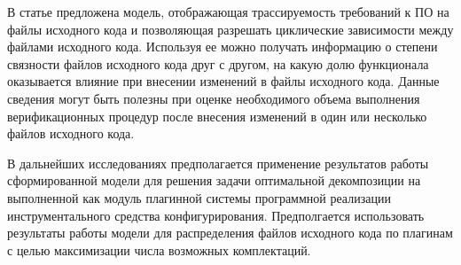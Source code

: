 

В статье предложена модель, отображающая трассируемость требований к ПО на файлы исходного кода и позволяющая разрешать циклические зависимости между файлами исходного кода. Используя ее можно получать информацию о степени связности файлов исходного кода друг с другом, на какую долю функционала оказывается влияние при внесении изменений в файлы исходного кода. Данные сведения могут быть полезны при оценке необходимого объема выполнения верификационных процедур после внесения изменений в один или несколько файлов исходного кода.

В дальнейших исследованиях предполагается применение результатов работы сформированной модели для решения задачи оптимальной декомпозиции на выполненной как модуль плагинной системы программной реализации инструментального средства конфигурирования. Предполгается использовать результаты работы модели для распределения файлов исходного кода по плагинам с целью максимизации числа возможных комплектаций.